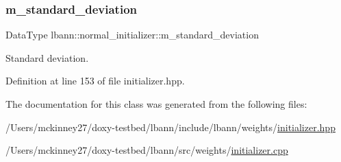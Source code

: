 \subsubsection{\texorpdfstring{m\+\_\+standard\+\_\+deviation}{m\_standard\_deviation}}
{\footnotesize\ttfamily Data\+Type lbann\+::normal\+\_\+initializer\+::m\+\_\+standard\+\_\+deviation\hspace{0.3cm}{\ttfamily [private]}}

Standard deviation. 

Definition at line 153 of file initializer.\+hpp.



The documentation for this class was generated from the following files\+:\begin{DoxyCompactItemize}
\item 
/\+Users/mckinney27/doxy-\/testbed/lbann/include/lbann/weights/\hyperlink{initializer_8hpp}{initializer.\+hpp}\item 
/\+Users/mckinney27/doxy-\/testbed/lbann/src/weights/\hyperlink{initializer_8cpp}{initializer.\+cpp}\end{DoxyCompactItemize}

